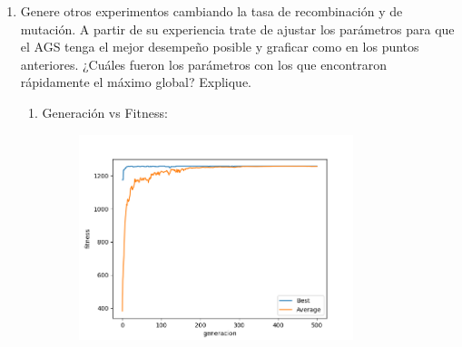\documentclass[11pt,letterpaper]{article}
\begin{document}
\begin{enumerate}[label=\alph*)]
        \item Genere otros experimentos cambiando la tasa de recombinación y de mutación. A partir de su experiencia trate de ajustar los parámetros para que el AGS tenga el mejor desempeño posible y graficar como en los puntos anteriores. ¿Cuáles fueron los parámetros con los que encontraron rápidamente el máximo global? Explique.
        
        \begin{enumerate}[label=\arabic*.]
            \item Generación vs Fitness:
            \begin{figure}[H]
                \centering
                \includegraphics[width=8cm]{images/parametros-ajustados/parametros-gen-vs-fitness.png}
                \label{fig:parametros-gen-vs-fit}
            \end{figure}
            

\end{enumerate}
\end{enumerate}
\end{document}
